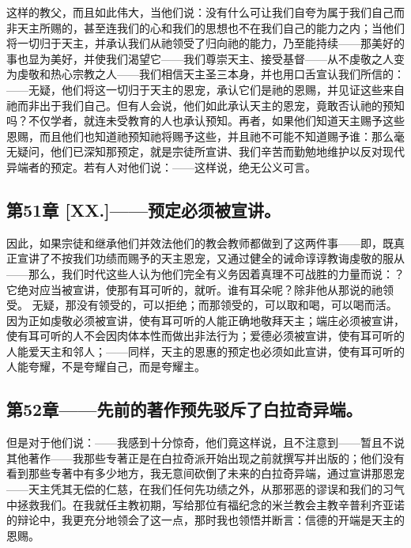 这样的教父，而且如此伟大，当他们说：没有什么可让我们自夸为属于我们自己而非天主所赐的，甚至连我们的心和我们的思想也不在我们自己的能力之内；当他们将一切归于天主，并承认我们从祂领受了归向祂的能力，乃至能持续——那美好的事也显为美好，并使我们渴望它——我们尊崇天主、接受基督——从不虔敬之人变为虔敬和热心宗教之人——我们相信天主圣三本身，并也用口舌宣认我们所信的：——无疑，他们将这一切归于天主的恩宠，承认它们是祂的恩赐，并见证这些来自祂而非出于我们自己。但有人会说，他们如此承认天主的恩宠，竟敢否认祂的预知吗？不仅学者，就连未受教育的人也承认预知。再者，如果他们知道天主赐予这些恩赐，而且他们也知道祂预知祂将赐予这些，并且祂不可能不知道赐予谁：那么毫无疑问，他们已深知那预定，就是宗徒所宣讲、我们辛苦而勤勉地维护以反对现代异端者的预定。若有人对他们说：——这样说，绝无公义可言。\par


\subsection{第51章 [XX.]——预定必须被宣讲。}

因此，如果宗徒和继承他们并效法他们的教会教师都做到了这两件事——即，既真正宣讲了不按我们功绩而赐予的天主恩宠，又通过健全的诫命谆谆教诲虔敬的服从——那么，我们时代这些人认为他们完全有义务因着真理不可战胜的力量而说：？它绝对应当被宣讲，使那有耳可听的，就听。谁有耳朵呢？除非他从那说的祂领受。 无疑，那没有领受的，可以拒绝；而那领受的，可以取和喝，可以喝而活。因为正如虔敬必须被宣讲，使有耳可听的人能正确地敬拜天主；端庄必须被宣讲，使有耳可听的人不会因肉体本性而做出非法行为；爱德必须被宣讲，使有耳可听的人能爱天主和邻人；——同样，天主的恩惠的预定也必须如此宣讲，使有耳可听的人能夸耀，不是夸耀自己，而是夸耀主。\par


\subsection{第52章——先前的著作预先驳斥了白拉奇异端。}

但是对于他们说：——我感到十分惊奇，他们竟这样说，且不注意到——暂且不说其他著作——我那些专著正是在白拉奇派开始出现之前就撰写并出版的；他们没有看到那些专著中有多少地方，我无意间砍倒了未来的白拉奇异端，通过宣讲那恩宠——天主凭其无偿的仁慈，在我们任何先功绩之外，从那邪恶的谬误和我们的习气中拯救我们。在我就任主教初期，写给那位有福纪念的米兰教会主教辛普利齐亚诺的辩论中，我更充分地领会了这一点，那时我也领悟并断言：信德的开端是天主的恩赐。\par

